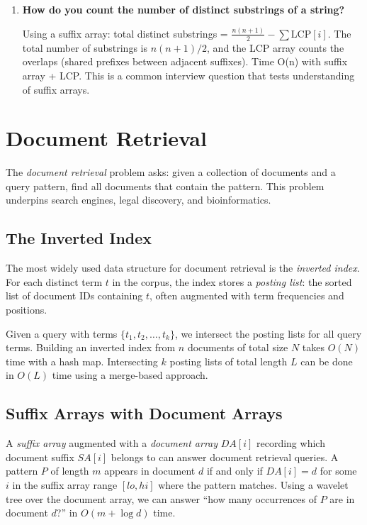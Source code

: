 \begin{enumerate}
\item \textbf{How do you count the number of distinct substrings of a string?}

Using a suffix array: total distinct substrings = $\frac{n(n+1)}{2} - \sum \text{LCP}[i]$. The total number of substrings is $n(n+1)/2$, and the LCP array counts the overlaps (shared prefixes between adjacent suffixes). Time O(n) with suffix array + LCP. This is a common interview question that tests understanding of suffix arrays.
\end{enumerate}


\section{Document Retrieval}
\label{sec:document-retrieval}

The \emph{document retrieval} problem asks: given a collection of documents and a query pattern, find all documents that contain the pattern. This problem underpins search engines, legal discovery, and bioinformatics.

\subsection{The Inverted Index}

The most widely used data structure for document retrieval is the \emph{inverted index}. For each distinct term $t$ in the corpus, the index stores a \emph{posting list}: the sorted list of document IDs containing $t$, often augmented with term frequencies and positions.

Given a query with terms $\{t_1, t_2, \ldots, t_k\}$, we intersect the posting lists for all query terms. Building an inverted index from $n$ documents of total size $N$ takes $O(N)$ time with a hash map. Intersecting $k$ posting lists of total length $L$ can be done in $O(L)$ time using a merge-based approach.

\subsection{Suffix Arrays with Document Arrays}

A \emph{suffix array} augmented with a \emph{document array} $DA[i]$ recording which document suffix $SA[i]$ belongs to can answer document retrieval queries. A pattern $P$ of length $m$ appears in document $d$ if and only if $DA[i] = d$ for some $i$ in the suffix array range $[lo, hi]$ where the pattern matches. Using a wavelet tree over the document array, we can answer ``how many occurrences of $P$ are in document $d$?'' in $O(m + \log d)$ time.

